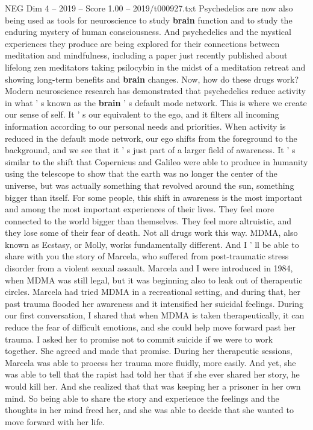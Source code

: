 \begin{textsample}{NEG Dim 4 – 2019 – Score 1.00 – 2019/t000927.txt}
Psychedelics are now also being used as tools for neuroscience to study \textbf{brain} function and to study the enduring mystery of human consciousness.
And psychedelics and the mystical experiences they produce are being explored for their connections between meditation and mindfulness, including a paper just recently published about lifelong zen meditators taking psilocybin in the midst of a meditation retreat and showing long-term benefits and \textbf{brain} changes.
Now, how do these drugs work?
Modern neuroscience research has demonstrated that psychedelics reduce activity in what ' s known as the \textbf{brain} ' s default mode network.
This is where we create our sense of self.
It ' s our equivalent to the ego, and it filters all incoming information according to our personal needs and priorities.
When activity is reduced in the default mode network, our ego shifts from the foreground to the background, and we see that it ' s just part of a larger field of awareness.
It ' s similar to the shift that Copernicus and Galileo were able to produce in humanity using the telescope to show that the earth was no longer the center of the universe, but was actually something that revolved around the sun, something bigger than itself.
For some people, this shift in awareness is the most important and among the most important experiences of their lives.
They feel more connected to the world bigger than themselves.
They feel more altruistic, and they lose some of their fear of death.
Not all drugs work this way.
MDMA, also known as Ecstasy, or Molly, works fundamentally different.
And I ' ll be able to share with you the story of Marcela, who suffered from post-traumatic stress disorder from a violent sexual assault.
Marcela and I were introduced in 1984, when MDMA was still legal, but it was beginning also to leak out of therapeutic circles.
Marcela had tried MDMA in a recreational setting, and during that, her past trauma flooded her awareness and it intensified her suicidal feelings.
During our first conversation, I shared that when MDMA is taken therapeutically, it can reduce the fear of difficult emotions, and she could help move forward past her trauma.
I asked her to promise not to commit suicide if we were to work together.
She agreed and made that promise.
During her therapeutic sessions, Marcela was able to process her trauma more fluidly, more easily.
And yet, she was able to tell that the rapist had told her that if she ever shared her story, he would kill her.
And she realized that that was keeping her a prisoner in her own mind.
So being able to share the story and experience the feelings and the thoughts in her mind freed her, and she was able to decide that she wanted to move forward with her life.

\end{textsample}
